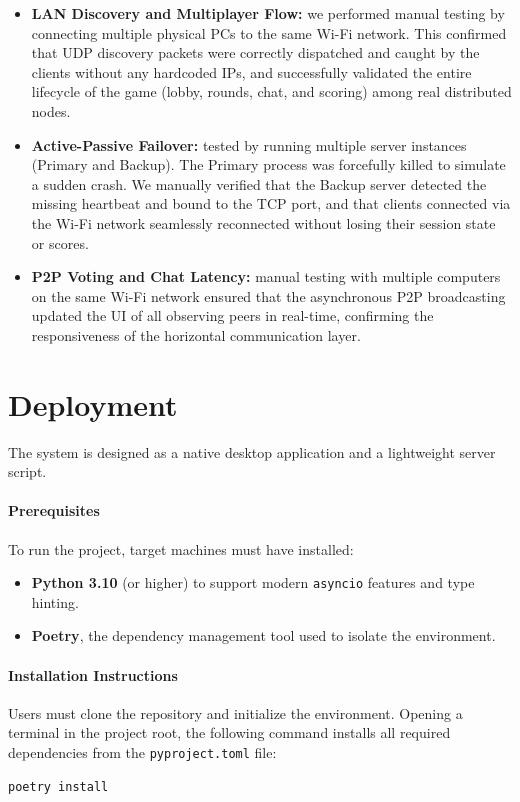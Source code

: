 \documentclass{scrartcl}
\begin{document}
\begin{itemize}
    \item \textbf{LAN Discovery and Multiplayer Flow:} we performed manual testing by connecting multiple physical PCs to the same Wi-Fi network. 
    This confirmed that UDP discovery packets were correctly dispatched and caught by the clients without any hardcoded IPs, 
    and successfully validated the entire lifecycle of the game (lobby, rounds, chat, and scoring) among real distributed nodes.
    \item \textbf{Active-Passive Failover:} tested by running multiple server instances (Primary and Backup). 
    The Primary process was forcefully killed to simulate a sudden crash. We manually verified that the Backup server detected the missing heartbeat and bound to the TCP port, 
    and that clients connected via the Wi-Fi network seamlessly reconnected without losing their session state or scores.
    \item \textbf{P2P Voting and Chat Latency:} manual testing with multiple computers on the same Wi-Fi network ensured that the asynchronous P2P broadcasting updated the UI of all observing peers in real-time, 
    confirming the responsiveness of the horizontal communication layer.
\end{itemize}

\section{Deployment}\label{deployment}

The system is designed as a native desktop application and a lightweight server script.

\paragraph{Prerequisites}
To run the project, target machines must have installed:
\begin{itemize}
    \item \textbf{Python 3.10} (or higher) to support modern \texttt{asyncio} features and type hinting.
    \item \textbf{Poetry}, the dependency management tool used to isolate the environment.
\end{itemize}

\paragraph{Installation Instructions}
Users must clone the repository and initialize the environment. 
Opening a terminal in the project root, the following command installs all required dependencies from the \texttt{pyproject.toml} file:
\begin{verbatim}
poetry install
\end{verbatim}
\end{document}
